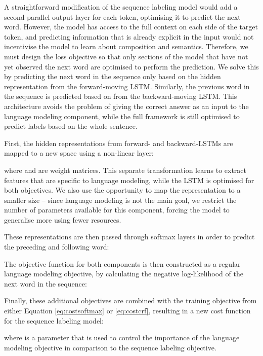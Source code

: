 \documentclass[11pt,a4paper]{article}
\begin{document}
A straightforward modification of the sequence labeling model would add a second parallel output layer for each token, optimising it to predict the next word. However, the model has access to the full context on each side of the target token, and predicting information that is already explicit in the input would not incentivise the model to learn about composition and semantics. 
Therefore, we must design the loss objective so that only sections of the model that have not yet observed the next word are optimised to perform the prediction. We solve this by predicting the next word in the sequence only based on the hidden representation  from the forward-moving LSTM. Similarly, the previous word in the sequence is predicted based on  from the backward-moving LSTM. 
This architecture avoids the problem of giving the correct answer as an input to the language modeling component, while the full framework is still optimised to predict labels based on the whole sentence. 

First, the hidden representations from forward- and backward-LSTMs are mapped to a new space using a non-linear layer:





\noindent where  and  are weight matrices. This separate transformation learns to extract features that are specific to language modeling, while the LSTM is optimised for both objectives. We also use the opportunity to map the representation to a smaller size -- since language modeling is not the main goal, we restrict the number of parameters available for this component, forcing the model to generalise more using fewer resources.

These representations are then passed through softmax layers in order to predict the preceding and following word:




The objective function for both components is then constructed as a regular language modeling objective, by calculating the negative log-likelihood of the next word in the sequence:




Finally, these additional objectives are combined with the training objective  from either Equation \ref{eq:costsoftmax} or \ref{eq:costcrf}, resulting in a new cost function  for the sequence labeling model:



\noindent where  is a parameter that is used to control the importance of the language modeling objective in comparison to the sequence labeling objective. 
\end{document}
